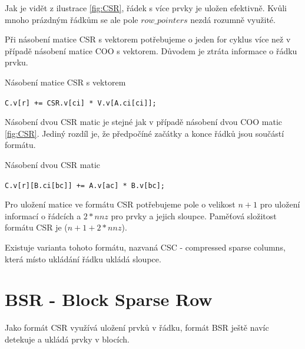 Jak je vidět z ilustrace \ref{fig:CSR}, řádek s více prvky je uložen efektivně. Kvůli mnoho prázdným řádkům se ale pole $row\_pointers$ nezdá rozumně využité.

Při násobení matice CSR s vektorem potřebujeme o jeden for cyklus více než v případě násobení matice COO s vektorem. Důvodem je ztráta informace o řádku prvku.

\begin{algorithm}[htb]
	\caption{Násobení matice CSR s vektorem}\label{csr-mvm}
	\begin{algorithmic}[1]
				\State \texttt{C.v[r] += CSR.v[ci] * V.v[A.ci[ci]];}
			\EndFor
		\EndFor
		\EndProcedure
	\end{algorithmic}
\end{algorithm}

Násobení dvou CSR matic je stejné jak v případě násobení dvou COO matic \ref{fig:CSR}. Jediný rozdíl je, že předpočíné začátky a konce řádků jsou součástí formátu.

\label{alg:csr-mmm}
\begin{algorithm}[htb]
	\caption{Násobení dvou CSR matic}\label{csr-mmm}
	\begin{algorithmic}[1]
					\State \texttt{C.v[r][B.ci[bc]] += A.v[ac] * B.v[bc];}
				\EndFor
			\EndFor
		\EndFor
		\EndProcedure
	\end{algorithmic}
\end{algorithm}

Pro uložení matice ve formátu CSR potřebujeme pole o velikost $n + 1$ pro uložení informací o řádcích a $2 * nnz$ pro prvky a jejich sloupce. Paměťová složitost formátu CSR je \bigO($ n+1 + 2*nnz $). 

Existuje varianta tohoto formátu, nazvaná CSC - compressed sparse columns, která místo ukládání řádku ukládá sloupce.

\section{BSR - Block Sparse Row}

Jako formát CSR využívá uložení prvků v řádku, formát BSR\cite{bsrscipy}\cite{bsrintel} ještě navíc detekuje a ukládá prvky v blocích.

